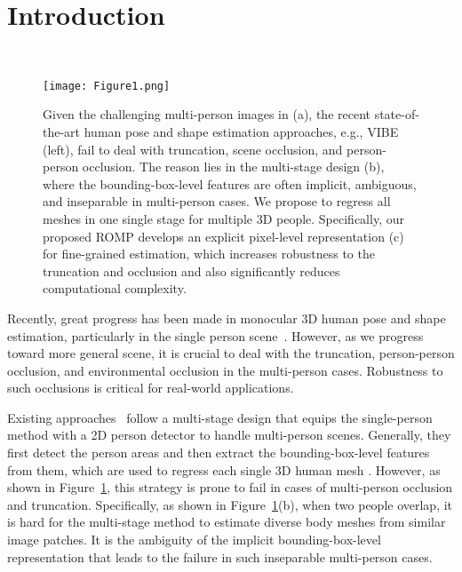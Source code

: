 \documentclass[10pt,twocolumn,letterpaper]{article}
\begin{document}
\section{Introduction}~\label{sec:intro}
\vspace{-5mm}

\begin{figure}[t]
	\centering
	\texttt{[image: Figure1.png]}
	\caption{
    Given the challenging multi-person images in (a), the recent state-of-the-art human pose and shape estimation approaches, e.g., VIBE~\cite{kocabas2020vibe} (left), fail to deal with truncation, scene occlusion, and person-person occlusion. 
 The reason lies in the multi-stage design (b), where the bounding-box-level features are often implicit, ambiguous, and inseparable in multi-person cases.
 We propose to regress all meshes in one single stage for multiple 3D people.
Specifically, our proposed ROMP develops an explicit pixel-level representation (c) for fine-grained estimation, which increases robustness to the truncation and occlusion and also significantly reduces computational complexity.
}\vspace{-5mm}
	\label{fig:motivation}
\end{figure}

Recently, great progress has been made in monocular 3D human pose and shape estimation, particularly in the single person scene~\cite{keep,Guler_2019_CVPR,hmr,kocabas2020vibe,kolotouros2019spin,surreal,Xu_2019_ICCV}.
However, as we progress toward more general scene, it is crucial to deal with the truncation, person-person occlusion, and environmental occlusion in the multi-person cases. 
Robustness to such occlusions is critical for real-world applications.

Existing approaches~\cite{jiang2020coherent,kocabas2020vibe,zanfir2018monocular,zanfir2018deep} follow a multi-stage design that equips the single-person method with a 2D person detector to handle  multi-person scenes.
Generally, they first detect the person areas and then extract the bounding-box-level features from them, which are used to regress each single 3D human mesh \cite{Guler_2019_CVPR,hmr,kanazawa2019learning,kocabas2020vibe,kolotouros2019spin,gcmr,pavlakos2019texturepose,sun2019dsd-satn,Xu_2019_ICCV,Zhu_2019_CVPR}. 
However, as shown in Figure~\ref{fig:motivation}, this strategy is prone to fail in cases of multi-person occlusion and truncation. 
Specifically, as shown in Figure~\ref{fig:motivation}(b), when two people overlap, it is hard for the multi-stage method to estimate diverse body meshes from similar image patches.
It is the ambiguity of the implicit bounding-box-level representation that leads to the failure in such inseparable multi-person cases. 
\end{document}
